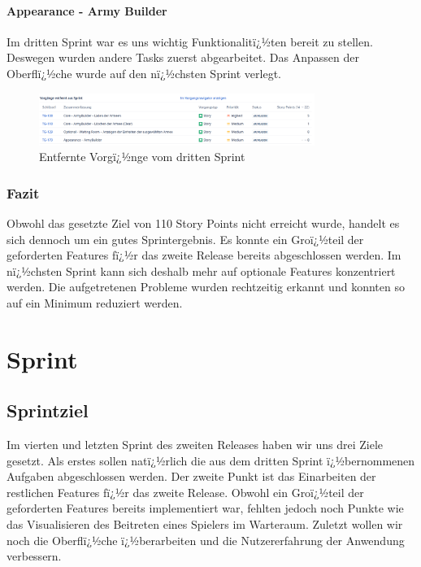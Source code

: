 \documentclass[12pt, titlepage]{scrartcl}
\newcommand{\RN}[1]{%
	\textup{\uppercase\expandafter{\romannumeral#1}}%
}
\begin{document}
			\paragraph{Appearance - Army Builder} Im dritten Sprint war es uns wichtig Funktionalitï¿½ten bereit zu stellen. Deswegen wurden andere Tasks zuerst abgearbeitet. Das Anpassen der Oberflï¿½che wurde auf den nï¿½chsten Sprint verlegt.
			\begin{figure}[H] 
				\centering
				\includegraphics[width=0.8\textwidth]{Aus_dem_Sprint_Entfernte_Vorgaenge_Sprint_3.PNG}
				\caption{Entfernte Vorgï¿½nge vom dritten Sprint}
				\label{EntfernteVorgaengeSprint3}
			\end{figure}
		
		\subsubsection{Fazit}
		Obwohl das gesetzte Ziel von 110 Story Points nicht erreicht wurde, handelt es sich dennoch um ein gutes Sprintergebnis. Es konnte ein Groï¿½teil der geforderten Features fï¿½r das zweite Release bereits abgeschlossen werden. Im nï¿½chsten Sprint kann sich deshalb mehr auf optionale Features konzentriert werden. Die aufgetretenen Probleme wurden rechtzeitig erkannt und konnten so auf ein Minimum reduziert werden. 
		
	\section{Sprint \RN{4}}
		\subsection{Sprintziel}
			Im vierten und letzten Sprint des zweiten Releases haben wir uns drei Ziele gesetzt. Als erstes sollen natï¿½rlich die aus dem dritten Sprint ï¿½bernommenen Aufgaben abgeschlossen werden. Der zweite Punkt ist das Einarbeiten der restlichen Features fï¿½r das zweite Release. Obwohl ein Groï¿½teil der geforderten Features bereits implementiert war, fehlten jedoch noch Punkte wie das Visualisieren des Beitreten eines Spielers im Warteraum. Zuletzt wollen wir noch die Oberflï¿½che ï¿½berarbeiten und die Nutzererfahrung der Anwendung verbessern.
		
\end{document}
